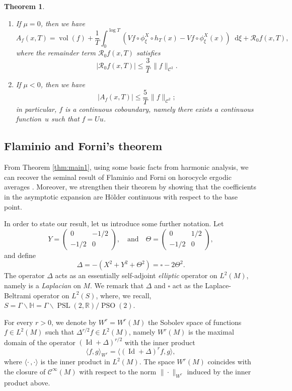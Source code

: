\documentclass[11pt]{article}
\newenvironment{enumeratei}
{\bgroup\def\theenumi{\roman{enumi}}\def\theenumii{\arabic{enumii}}\begin{enumerate}}
{\end{enumerate}\egroup}
\newcommand \R{\mathbb{R}}
\newcommand \Hbb{\mathbb{H}}
\newcommand*{\diff}{\mathop{}\!\mathrm{d}}
\newcommand{\aver}[1]{A_{#1}(x,T)}
\DeclareMathOperator{\PSL}{PSL}
\DeclareMathOperator{\PSO}{PSO}
\DeclareMathOperator{\vol}{vol}
\DeclareMathOperator{\Id}{Id}
\newtheorem{theorem}{Theorem}
\theoremstyle{definition}
\begin{document}
\begin{theorem}
\begin{enumeratei}
\item\label{thm:main1iv}
If $\mu = 0$, then we have
\[
\aver{f} = \vol(f) + \frac{1}{T} \int_0^{\log T} \left(Vf \circ \phi^X_\xi \circ h_T(x) - Vf\circ \phi^X_\xi (x) \right) \diff \xi + \mathcal{R}_{0}f(x,T),
\]
where the remainder term $\mathcal{R}_{0}f(x,T)$ satisfies
\[
|\mathcal{R}_{0}f(x,T)|\leq \frac{3}{T}\, \|f\|_{\mathscr{C}^2}.
\]

\item\label{thm:main1v}
If $\mu < 0$, then we have
\[
|\aver{f} |\leq \frac{5}{T}\, \|f\|_{\mathscr{C}^2};
\]
in particular, $f$ is a continuous coboundary, namely there exists a continuous function~$u$ such that $f=Uu$.
\end{enumeratei}
\end{theorem}

\subsection{Flaminio and Forni's theorem}

From Theorem \ref{thm:main1}, using some basic facts from harmonic analysis, we can recover the seminal result of Flaminio and Forni on horocycle ergodic averages \cite[Th.\,1.5]{FlaFo}.
Moreover, we strengthen their theorem by showing that the coefficients in the asymptotic expansion are Hölder continuous with respect to the base point.

In order to state our result, let us introduce some further notation.
Let
\[
Y =
\begin{pmatrix}
0 & -1/2 \\
-1/2 & 0
\end{pmatrix},
\ \ \ \text{ and }\ \ \
\Theta =
\begin{pmatrix}
0 & 1/2 \\
-1/2 & 0
\end{pmatrix},
\]
and define
\[
\Delta = -(X^2 + Y^2 + \Theta^2) = \square - 2 \Theta^2.
\]
The operator $\Delta$ acts as an essentially self-adjoint \emph{elliptic} operator on $L^2(M)$, namely is a \emph{Laplacian} on $M$.
We remark that $\Delta$ and $\square$ act as the Laplace-Beltrami operator on $L^2(S)$, where, we recall, $S = \Gamma \backslash \Hbb = \Gamma \backslash \PSL(2,\R) / \PSO(2)$.

For every $r >0$, we denote by $W^r=W^r(M)$ the Sobolev space of functions $f \in L^2(M)$ such that $\Delta^{r/2}f \in L^2(M)$, namely $W^r(M)$ is the maximal domain of the operator $(\Id + \Delta)^{r/2}$ with the inner product
\begin{equation}\label{eq:def_inn_prod_Wr}
\langle f,g \rangle_{W^r} = \langle (\Id + \Delta)^rf,g \rangle,
\end{equation}
where $\langle \cdot\,, \cdot \rangle$ is the inner product in $L^2(M)$.
The space $W^r(M)$ coincides with the closure of $\mathscr{C}^\infty(M)$ with respect to the norm $\|{\cdot} \|_{W^r}$ induced by the inner product above.
\end{document}
